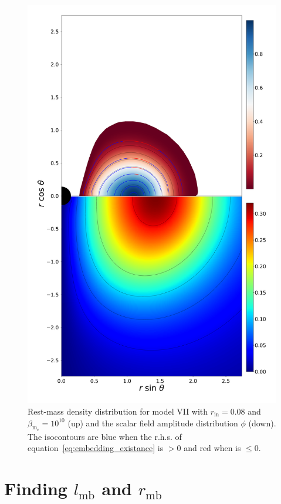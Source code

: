 \documentclass[twocolumn,aps,showpacs,showkeys,prd,superscriptaddress,byrevtex, amsmath]{revtex4-1}
\begin{document}
\begin{appendix}
\begin{figure}
\centering
\includegraphics[scale=0.2]{figures/embedding.pdf}
\hspace{0.5cm}
\caption{Rest-mass density distribution for model VII with $r_{\mathrm{in}} = 0.08$ and $\beta_{\mathrm{m_c}} = 10^{10}$ (up) and the scalar field amplitude distribution $\phi$ (down). The isocontours are blue when the r.h.s. of equation~\eqref{eq:embedding_existance} is $> 0$ and red when is $\leq 0$.}
\label{embedding_VII}
\end{figure}

\section{Finding $l_{\mathrm{mb}}$ and $r_{\mathrm{mb}}$}\label{ang_mom_appendix}
\end{appendix}     
\end{document}
